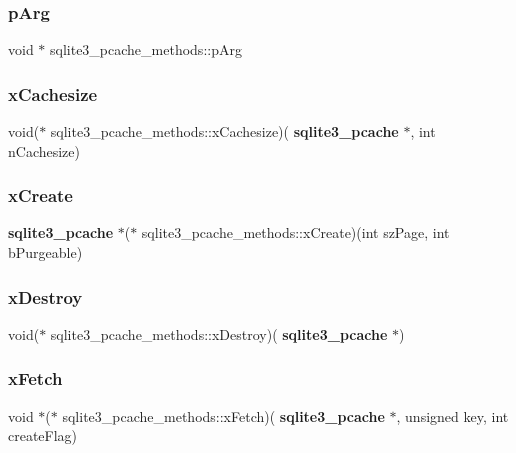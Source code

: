 \subsubsection{pArg}
{\footnotesize\ttfamily void $\ast$ sqlite3\+\_\+pcache\+\_\+methods\+::p\+Arg}

\mbox{\label{structsqlite3__pcache__methods_a9cf385dbec7f0d19793e2616a73a3b7f}} 
\subsubsection{xCachesize}
{\footnotesize\ttfamily void($\ast$ sqlite3\+\_\+pcache\+\_\+methods\+::x\+Cachesize)(\textbf{ sqlite3\+\_\+pcache} $\ast$, int n\+Cachesize)}

\mbox{\label{structsqlite3__pcache__methods_a36b1da95aeb7972c3c0d358aedf2a3d4}} 
\subsubsection{xCreate}
{\footnotesize\ttfamily \textbf{ sqlite3\+\_\+pcache} $\ast$($\ast$ sqlite3\+\_\+pcache\+\_\+methods\+::x\+Create)(int sz\+Page, int b\+Purgeable)}

\mbox{\label{structsqlite3__pcache__methods_aac18fc581d8d63550a6657016c24ba5d}} 
\subsubsection{xDestroy}
{\footnotesize\ttfamily void($\ast$ sqlite3\+\_\+pcache\+\_\+methods\+::x\+Destroy)(\textbf{ sqlite3\+\_\+pcache} $\ast$)}

\mbox{\label{structsqlite3__pcache__methods_a2e054ad70c9672b504d3d7291e4eb487}} 
\subsubsection{xFetch}
{\footnotesize\ttfamily void $\ast$($\ast$ sqlite3\+\_\+pcache\+\_\+methods\+::x\+Fetch)(\textbf{ sqlite3\+\_\+pcache} $\ast$, unsigned key, int create\+Flag)}

